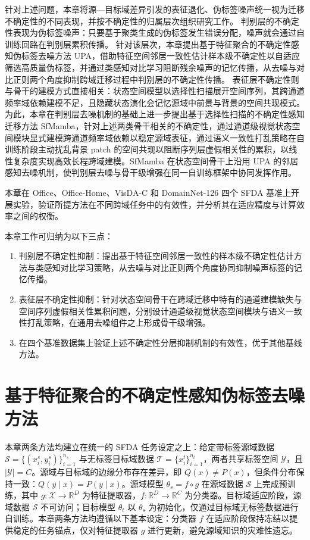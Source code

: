 针对上述问题，本章将源—目标域差异引发的表征退化、伪标签噪声统一视为迁移不确定性的不同表现，并按不确定性的归属层次组织研究工作。
判别层的不确定性表现为伪标签噪声：只要基于聚类生成的伪标签发生错误分配，噪声就会通过自训练回路在判别层累积传播。
针对该层次，本章提出基于特征聚合的不确定性感知伪标签去噪方法 UPA，借助特征空间邻居一致性估计样本级不确定性以自适应筛选高质量伪标签，并通过类感知对比学习阻断残余噪声的记忆传播，从去噪与对比正则两个角度抑制跨域迁移过程中判别层的不确定性传播。
表征层不确定性则与骨干的建模方式直接相关：状态空间模型以选择性扫描展开空间序列，其跨通道频率域依赖建模不足，且隐藏状态演化会记忆源域中前景与背景的空间共现模式。为此，本章在判别层去噪机制的基础上进一步提出基于选择性扫描的不确定性感知迁移方法 SfMamba，针对上述两类骨干相关的不确定性，通过通道级视觉状态空间模块显式建模跨通道频率域依赖以稳定源域表征，通过语义一致性打乱策略在自训练阶段主动扰乱背景 patch 的空间共现以阻断序列层虚假相关性的累积，以线性复杂度实现高效长程跨域建模。SfMamba 在状态空间骨干上沿用 UPA 的邻居感知去噪机制，使判别层去噪与骨干级增强在同一自训练框架中协同发挥作用。

本章在 Office、Office-Home、VisDA-C 和 DomainNet-126 四个 SFDA 基准上开展实验，验证所提方法在不同跨域任务中的有效性，并分析其在适应精度与计算效率之间的权衡。

本章工作可归纳为以下三点：
\begin{enumerate}
    \item 判别层不确定性抑制：提出基于特征空间邻居一致性的样本级不确定性估计方法与类感知对比学习策略，从去噪与对比正则两个角度协同抑制噪声标签的记忆传播。
    \item 表征层不确定性抑制：针对状态空间骨干在跨域迁移中特有的通道建模缺失与空间序列虚假相关性累积问题，分别设计通道级视觉状态空间模块与语义一致性打乱策略，在通用去噪组件之上形成骨干级增强。
    \item 在四个基准数据集上验证上述不确定性分层抑制机制的有效性，优于其他基线方法。
\end{enumerate}


\section{基于特征聚合的不确定性感知伪标签去噪方法}

\label{sec:chap2_upa}

本章两条方法均建立在统一的 SFDA 任务设定之上：给定带标签源域数据 $\mathcal{S} = \{(x_i^s, y_i^s)\}_{i=1}^{n_s}$ 与无标签目标域数据 $\mathcal{T} = \{x_i^t\}_{i=1}^{n_t}$，两者共享标签空间 $\mathcal{Y}$，且 $|\mathcal{Y}| = C$。源域与目标域的边缘分布存在差异，即 $Q(x) \neq P(x)$，但条件分布保持一致：$Q(y \mid x) = P(y \mid x)$。源域模型 $\theta_s = f \circ g$ 在源域数据 $\mathcal{S}$ 上完成预训练，其中 $g: \mathcal{X} \to \mathbb{R}^D$ 为特征提取器，$f: \mathbb{R}^D \to \mathbb{R}^C$ 为分类器。目标域适应阶段，源域数据 $\mathcal{S}$ 不可访问；目标模型 $\theta_t$ 以 $\theta_s$ 为初始化，仅通过目标域无标签数据进行自训练。本章两条方法均遵循以下基本设定：分类器 $f$ 在适应阶段保持冻结以提供稳定的任务锚点，仅对特征提取器 $g$ 进行更新，避免源域知识的灾难性遗忘。

